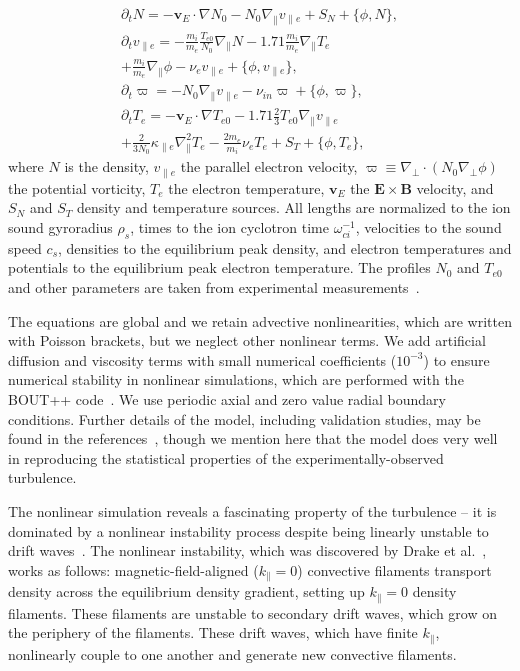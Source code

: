 \documentclass[letter,scriptaddress,twocolumn, prl,showkeys]{revtex4}
\def\beqar{\begin{eqnarray}}
\def\eeqar{\end{eqnarray}}
\def\para{\parallel}
\newcommand{\pdt}{\partial_t}
\def\grad{\nabla}
\newcommand{\gradpar}{\grad_\parallel}
\newcommand{\gradperp}{\grad_\perp}
\newcommand{\vpe}{v_{\parallel e}}
\newcommand{\nue}{\nu_{e}}
\newcommand{\nuin}{\nu_{in}}
\newcommand{\kpe}{\kappa_{\parallel e}}
\newcommand{\fmie}{\frac{m_i}{m_e}}
\begin{document}
\beqar
\label{ni_eq}
\pdt N = - {\mathbf v_E} \cdot \grad N_0 - N_0 \gradpar \vpe + S_N + \{\phi,N\}, \\
\label{ve_eq}
\pdt \vpe = - \fmie \frac{T_{e0}}{N_0} \gradpar N - 1.71 \fmie \gradpar T_e  \nonumber \\
+ \fmie \gradpar \phi - \nue \vpe + \{\phi,\vpe \}, \\
\label{rho_eq}
\pdt \varpi = - N_0 \gradpar \vpe  - \nuin \varpi + \{\phi,\varpi \}, \\
\label{te_eq}
\pdt T_e = - {\mathbf v_E} \cdot \grad T_{e0} - 1.71 \frac{2}{3} T_{e0} \gradpar \vpe \nonumber \\
+ \frac{2}{3 N_0} \kpe \gradpar^2 T_e  - \frac{2 m_e}{m_i} \nue T_e  +  S_T + \{\phi,T_e\},
\eeqar
where $N$ is the density, $\vpe$ the parallel electron velocity, $\varpi \equiv \gradperp \cdot (N_0 \gradperp \phi)$ the potential vorticity,
$T_e$ the electron temperature, ${\mathbf v_E}$ the ${\mathbf E} \times {\mathbf B}$ velocity, and $S_N$ and $S_T$ density and temperature sources. All lengths are
normalized to the ion sound gyroradius $\rho_s$, times to the ion cyclotron time $\omega_{ci}^{-1}$, velocities to the sound speed $c_s$, 
densities to the equilibrium peak density, and electron temperatures and potentials to the equilibrium peak electron temperature. 
The profiles $N_0$ and $T_{e0}$ and other parameters are taken from experimental measurements~\cite{schaffner2012,friedman2012b,friedman2013}. 

The equations are global and we retain advective nonlinearities, which are written with Poisson brackets, but we neglect other nonlinear terms. 
We add artificial diffusion and viscosity terms with small numerical coefficients ($10^{-3}$)
to ensure numerical stability in nonlinear simulations, which are performed with the BOUT++ code~\cite{dudson2009}. We use periodic axial and zero value radial 
boundary conditions. Further details of the model, including validation studies, may be found in the references~\cite{Popovich2010a,Popovich2010b,Umansky2011,friedman2012b,friedman2013},
though we mention here that the model does very well in reproducing the statistical properties of the experimentally-observed turbulence.

The nonlinear simulation reveals a fascinating property of the turbulence -- 
it is dominated by a nonlinear instability process despite being linearly unstable to drift waves~\cite{friedman2012b,friedman2013}.
The nonlinear instability, which was discovered by Drake et al.~\cite{drake1995}, works as follows: 
magnetic-field-aligned ($k_\para=0$) convective filaments transport density across the equilibrium density gradient, setting up $k_\para=0$ density filaments. 
These filaments are unstable to secondary drift waves, which grow on the periphery of the filaments. 
These drift waves, which have finite $k_\para$, nonlinearly couple to one another and generate new convective filaments.
\end{document}
